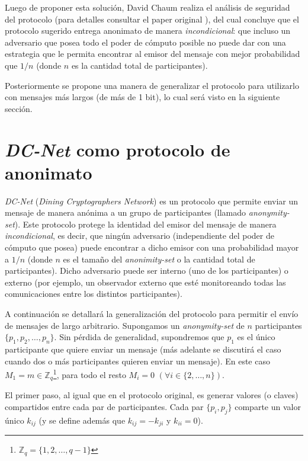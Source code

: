 Luego de proponer esta solución, David Chaum realiza el análisis de seguridad del protocolo (para detalles consultar el paper original 
\cite{chaum1988dining}), del cual concluye que el protocolo sugerido entrega anonimato de manera \emph{incondicional}: que incluso 
un adversario que posea todo el poder de cómputo posible no puede dar con una estrategia que le permita encontrar al emisor del mensaje 
con mejor probabilidad que $1/n$ (donde $n$ es la cantidad total de participantes).

Posteriormente se propone una manera de generalizar el protocolo para utilizarlo con mensajes más largos (de más de 1 bit), lo cual será 
visto en la siguiente sección.

\section{\emph{DC-Net} como protocolo de anonimato}

\emph{DC-Net} (\emph{Dining Cryptographers Network}) es un protocolo que permite enviar un mensaje de manera anónima a un grupo de participantes 
(llamado \emph{anonymity-set}). Este protocolo protege la identidad del emisor del mensaje de manera 
\emph{incondicional}, es decir, que ningún adversario (independiente del poder de cómputo que posea) puede encontrar a dicho emisor con 
una probabilidad mayor a $1/n$ (donde $n$ es el tamaño del \emph{anonimity-set} o la cantidad total de participantes). Dicho adversario puede 
ser interno (uno de los participantes) o externo (por ejemplo, un observador externo que esté monitoreando todas las comunicaciones entre los distintos participantes).

A continuación se detallará la generalización del protocolo para permitir el envío de mensajes de largo arbitrario. 
Supongamos un \emph{anonymity-set} de $n$ participantes $\{p_1, p_2, \ldots, p_n\}$. Sin pérdida de generalidad, supondremos que $p_1$ es el único 
participante que quiere enviar un mensaje (más adelante 
se discutirá el caso cuando dos o más participantes quieren enviar un mensaje). 
En este caso $M_1 = m \in \mathbb{Z}_q$\footnote{$\mathbb{Z}_q = \{1, 2, \ldots, q - 1\}$}, para todo el resto $M_i = 0$ $(\forall i \in \{2, \ldots, n\})$.

El primer paso, al igual que en el protocolo original, es generar valores (o claves) compartidos entre cada par de participantes. Cada par $\{p_i, p_j\}$ comparte un valor único $k_{ij}$ (y se define además que $k_{ij} = -k_{ji}$ y $k_{ii} = 0$).

